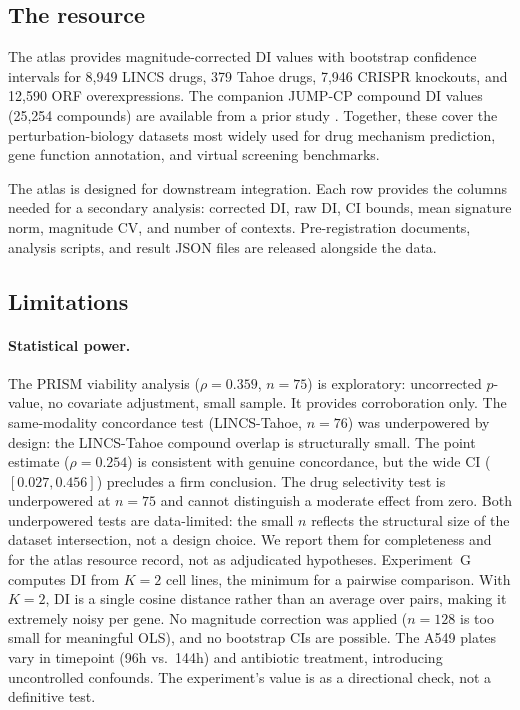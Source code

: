 \documentclass[11pt]{article}
\begin{document}
\subsection{The resource}

The atlas provides magnitude-corrected DI values with bootstrap
confidence intervals for 8{,}949 LINCS drugs, 379 Tahoe drugs, 7{,}946
CRISPR knockouts, and 12{,}590 ORF overexpressions.  The companion JUMP-CP
compound DI values (25{,}254 compounds) are available from a prior
study \citep{tower2026confound}.  Together, these cover the
perturbation-biology datasets most widely used for drug mechanism
prediction, gene function annotation, and virtual screening
benchmarks.

The atlas is designed for downstream integration.  Each row provides the
columns needed for a secondary analysis: corrected DI, raw DI, CI
bounds, mean signature norm, magnitude CV, and number of contexts.
Pre-registration documents, analysis scripts, and result JSON files are
released alongside the data.

\subsection{Limitations}

\paragraph{Statistical power.}
The PRISM viability analysis ($\rho = 0.359$, $n = 75$) is exploratory:
uncorrected $p$-value, no covariate adjustment, small sample.  It
provides corroboration only.
The same-modality concordance test (LINCS-Tahoe, $n = 76$) was
underpowered by design: the LINCS-Tahoe compound overlap is
structurally small.  The point estimate ($\rho = 0.254$) is consistent
with genuine concordance, but the wide CI ($[0.027, 0.456]$) precludes a
firm conclusion.
The drug selectivity test is underpowered at $n = 75$ and cannot
distinguish a moderate effect from zero.  Both underpowered tests are
data-limited: the small $n$ reflects the structural size of the dataset
intersection, not a design choice.  We report them for completeness and
for the atlas resource record, not as adjudicated hypotheses.
Experiment~G computes DI from $K = 2$ cell lines, the minimum for a
pairwise comparison.  With $K = 2$, DI is a single cosine distance
rather than an average over pairs, making it extremely noisy per gene.
No magnitude correction was applied ($n = 128$ is too small for
meaningful OLS), and no bootstrap CIs are possible.  The A549 plates
vary in timepoint (96h vs.\ 144h) and antibiotic treatment, introducing
uncontrolled confounds.  The experiment's value is as a directional
check, not a definitive test.
\end{document}
